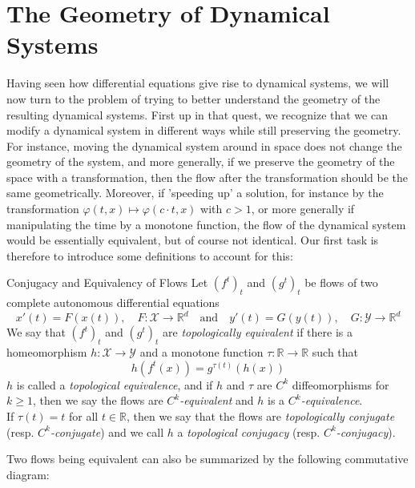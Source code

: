 \documentclass[11pt, a4paper]{memoir}
\theoremstyle{break}
\theoremstyle{break}
\theoremstyle{nonumberplain}
\newcommand{\mR}{\mathbb{R}}
\begin{document}
\section{The Geometry of Dynamical Systems}
Having seen how differential equations give rise to dynamical systems, we will now turn to the problem of trying to better understand the geometry of the  resulting dynamical systems. First up in that quest, we recognize that we can modify a dynamical system in different ways while still preserving the geometry. For instance, moving the dynamical system around in space does not change the geometry of the system, and more generally, if we preserve the geometry of the space with a transformation, then the flow after the transformation should be the same geometrically. Moreover, if 'speeding up' a solution, for instance by the transformation $\varphi(t,x)\mapsto\varphi(c\cdot t,x)$ with $c>1$, or  more generally if manipulating the time by a monotone function, the flow of the dynamical system would be essentially equivalent, but of course not identical. Our first task is therefore to introduce some definitions to account for this:
\begin{mydefinition}{Conjugacy and Equivalency of Flows}
Let $(f^t)_t$ and $(g^t)_t$ be flows of two complete autonomous differential equations
$$x'(t)=F(x(t)), \quad F:\mathcal{X}\to\mR^d\quad\text{and}\quad y'(t)=G(y(t)),\quad G:\mathcal{Y}\to\mR^d$$
We say that $(f^t)_t$ and $(g^t)_t$ are \emph{topologically equivalent} if there is a homeomorphism $h:\mathcal{X}\to\mathcal{Y}$ and a monotone function $\tau:\mR\to\mR$ such that
$$h(f^t(x))=g^{\tau(t)}(h(x))$$
$h$ is called a \emph{topological equivalence}, and if $h$ and $\tau$ are $C^k$ diffeomorphisms for $k\geqslant 1$, then we say the flows are \emph{$C^k$-equivalent} and $h$ is a \emph{$C^k$-equivalence}.\\[5pt]
If $\tau(t)=t$ for all $t\in \mR$, then we say that the flows are \emph{topologically conjugate} (resp. \emph{$C^k$-conjugate}) and we call $h$ a \emph{topological conjugacy} (resp. \emph{$C^k$-conjugacy}).
\end{mydefinition}
\noindent Two flows being equivalent can also be summarized by the following commutative diagram:
\begin{center}
\end{center}
\end{document}
